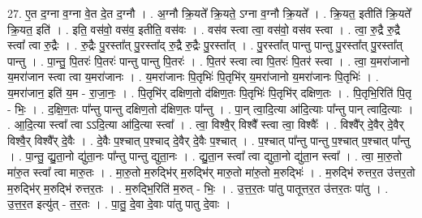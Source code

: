 \documentclass[17pt]{extarticle}
\begin{document}
27. ए॒त द॒ग्ना व॒ग्ना वे॒त दे॒त द॒ग्नौ । . अ॒ग्नौ क्रि॒यते᳚ क्रि॒यते॒ ऽग्ना व॒ग्नौ क्रि॒यते᳚ । . क्रि॒यत॒ इतीति॑ क्रि॒यते᳚ क्रि॒यत॒ इति॑ । . इति॒ वस॑वो॒ वस॑व॒ इतीति॒ वस॑वः । . वस॑व स्त्वा त्वा॒ वस॑वो॒ वस॑व स्त्वा । . त्वा॒ रु॒द्रै रु॒द्रै स्त्वा᳚ त्वा रु॒द्रैः । . रु॒द्रैः पु॒रस्ता᳚त् पु॒रस्ता᳚द् रु॒द्रै रु॒द्रैः पु॒रस्ता᳚त् । . पु॒रस्ता᳚त् पान्तु पान्तु पु॒रस्ता᳚त् पु॒रस्ता᳚त् पान्तु । . पा॒न्तु॒ पि॒तरः॑ पि॒तरः॑ पान्तु पान्तु पि॒तरः॑ । . पि॒तर॑ स्त्वा त्वा पि॒तरः॑ पि॒तर॑ स्त्वा । . त्वा॒ य॒मरा॑जानो य॒मरा॑जान स्त्वा त्वा य॒मरा॑जानः । . य॒मरा॑जानः पि॒तृभिः॑ पि॒तृभि॑र् य॒मरा॑जानो य॒मरा॑जानः पि॒तृभिः॑ । . य॒मरा॑जान॒ इति॑ य॒म - रा॒जा॒नः॒ । . पि॒तृभि॑र् दक्षिण॒तो द॑क्षिण॒तः पि॒तृभिः॑ पि॒तृभि॑र् दक्षिण॒तः । . पि॒तृभि॒रिति॑ पि॒तृ - भिः॒ । . द॒क्षि॒ण॒तः पा᳚न्तु पान्तु दक्षिण॒तो द॑क्षिण॒तः पा᳚न्तु । . पा॒न् त्वा॒दि॒त्या आ॑दि॒त्याः पा᳚न्तु पान् त्वादि॒त्याः । . आ॒दि॒त्या स्त्वा᳚ त्वा ऽऽदि॒त्या आ॑दि॒त्या स्त्वा᳚ । . त्वा॒ विश्वै॒र् विश्वै᳚ स्त्वा त्वा॒ विश्वैः᳚ । . विश्वै᳚र् दे॒वैर् दे॒वैर् विश्वै॒र् विश्वै᳚र् दे॒वैः । . दे॒वैः प॒श्चात् प॒श्चाद् दे॒वैर् दे॒वैः प॒श्चात् । . प॒श्चात् पा᳚न्तु पान्तु प॒श्चात् प॒श्चात् पा᳚न्तु । . पा॒न्तु॒ द्यु॒ता॒नो द्यु॑ता॒नः पा᳚न्तु पान्तु द्युता॒नः । . द्यु॒ता॒न स्त्वा᳚ त्वा द्युता॒नो द्यु॑ता॒न स्त्वा᳚ । . त्वा॒ मा॒रु॒तो मा॑रु॒त स्त्वा᳚ त्वा मारु॒तः । . मा॒रु॒तो म॒रुद्भि॑र् म॒रुद्भि॑र् मारु॒तो मा॑रु॒तो म॒रुद्भिः॑ । . म॒रुद्भि॑ रुत्तर॒त उ॑त्तर॒तो म॒रुद्भि॑र् म॒रुद्भि॑ रुत्तर॒तः । . म॒रुद्भि॒रिति॑ म॒रुत् - भिः॒ । . उ॒त्त॒र॒तः पा॑तु पातूत्तर॒त उ॑त्तर॒तः पा॑तु । . उ॒त्त॒र॒त इत्यु॑त् - त॒र॒तः । . पा॒तु॒ दे॒वा दे॒वाः पा॑तु पातु दे॒वाः । \newline
\end{document}
